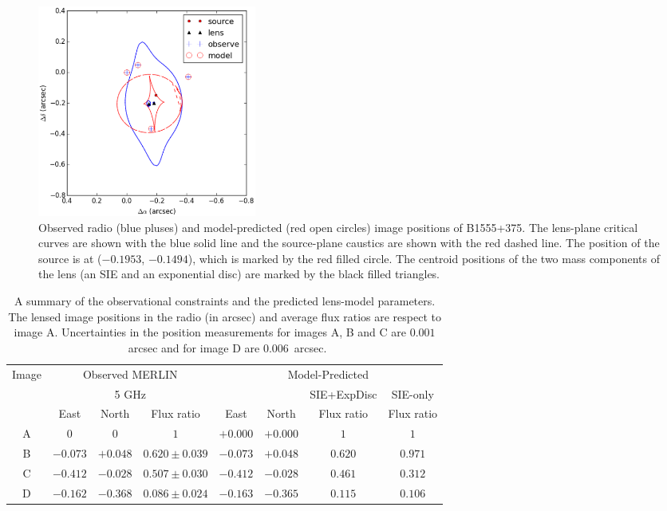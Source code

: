 \documentclass[a4paper,fleqn,usenatbib,useAMS]{mnras}
\begin{document}
\begin{figure}
\includegraphics[width=72mm]{gravlens_exp_try5_plot-2.eps}
\caption{Observed radio (blue pluses) and model-predicted (red open circles) image positions of B1555+375. The lens-plane critical curves are shown with the blue solid line and the source-plane caustics are shown with the red dashed line. The position of the source is at ($-0.1953$, $-0.1494$), which is marked by the red filled circle. The centroid positions of the two mass components of the lens (an SIE and an exponential disc) are marked by the black filled triangles.}
\label{fig:model}
\end{figure}

\begin{table}
\centering
\caption{A summary of the observational constraints and the predicted lens-model parameters. The lensed image positions in the radio \citep{Marlow99} (in arcsec) and average flux ratios \citep{K03} are respect to image A. Uncertainties in the position measurements for images A, B and C are $0.001$~arcsec and for image D are $0.006$~arcsec.}
\begin{tabular}{cccccccc}
\hline
Image	&\multicolumn{3}{c}{Observed MERLIN} 	 	& \multicolumn{4}{c}{Model-Predicted}\\
		&\multicolumn{3}{c}{5 GHz}		& & & {SIE+ExpDisc} & SIE-only\\
		&East &North & Flux ratio &East 	&North & Flux ratio &Flux ratio\\ 
\hline
A  &$0$    		&$0$			&  $1$ 				&$+0.000$  &$+0.000$	& $1$ 		& $1$\\  
B  &$-0.073$	&$+0.048$	& $0.620 \pm 0.039$ 	&$-0.073$ &$+0.048$		& $0.620$ 	& $0.971$ \\  
C  &$-0.412$ 	&$-0.028$	& $0.507\pm 0.030$	&$-0.412$ &$-0.028$		& $0.461$ 	& $0.312$\\  
D  &$-0.162$	&$-0.368$	& $0.086 \pm 0.024$ 	&$-0.163$ &$-0.365$		& $0.115$ 	& $0.106$\\  
\hline
\end{tabular}
\label{tab:results}
\end{table}
\end{document}
